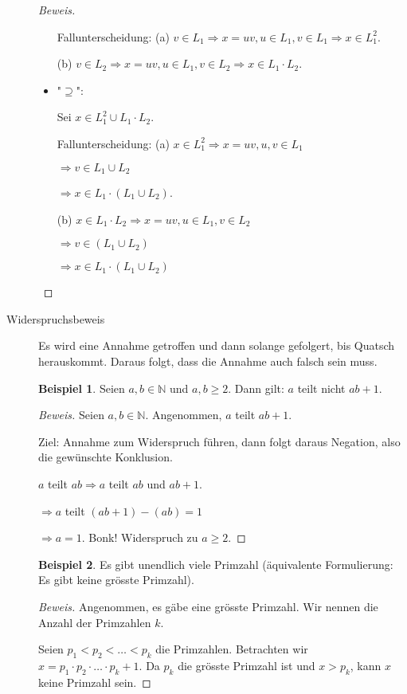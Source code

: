 \documentclass[11pt]{article} %
\theoremstyle{definition}
\newtheorem*{beispiel}{Beispiel}
\begin{document}
\begin{description}
\begin{proof}[Beweis]
\begin{itemize}
Fallunterscheidung: (a) $v \in L_1 \Rightarrow x = uv, u \in L_1, v \in L_1 \Rightarrow x \in L_1^2$.

(b) $v \in L_2 \Rightarrow x = uv, u \in L_1, v \in L_2 \Rightarrow x \in L_1\cdot L_2$.

\item "$\supseteq$":

Sei $x \in L_1^2 \cup L_1\cdot L_2$.

Fallunterscheidung: (a) $x \in L_1^2 \Rightarrow x = uv, u, v \in L_1 $

$\Rightarrow v \in L_1 \cup L_2$

$\Rightarrow x \in L_1\cdot(L_1 \cup L_2)$.

(b) $x \in L_1\cdot L_2 \Rightarrow x = uv, u \in L_1, v \in L_2$

$\Rightarrow v \in (L_1 \cup L_2)$

$\Rightarrow x \in L_1\cdot(L_1 \cup L_2)$
\end{itemize}
\end{proof}

\item[Widerspruchsbeweis] Es wird eine Annahme getroffen und dann solange gefolgert, bis Quatsch herauskommt. Daraus folgt, dass die Annahme auch falsch sein muss.

\begin{beispiel}
Seien $a,b \in \mathbb{N}$ und $a,b \ge 2$. Dann gilt: $a$ teilt nicht $ab + 1$.
\end{beispiel}
\begin{proof}[Beweis]
Seien $a,b \in \mathbb{N}$. Angenommen, $a$ teilt $ab + 1$.

Ziel: Annahme zum Widerspruch führen, dann folgt daraus Negation, also die gewünschte Konklusion.

$a$ teilt $ab \Rightarrow a$ teilt $ab$ und $ab + 1$.

$\Rightarrow a$ teilt $(ab + 1)-(ab) = 1$

$\Rightarrow a = 1$. Bonk! Widerspruch zu $a \ge 2$.
\end{proof}

\begin{beispiel}
Es gibt unendlich viele Primzahl (äquivalente Formulierung: Es gibt keine grösste Primzahl).
\end{beispiel}

\begin{proof}[Beweis]
Angenommen, es gäbe eine grösste Primzahl. Wir nennen die Anzahl der Primzahlen $k$.

Seien $p_1 < p_2 < \dots < p_k$ die Primzahlen. Betrachten wir $x = p_1\cdot p_2 \cdot \dots \cdot p_k + 1$. Da $p_k$ die grösste Primzahl ist und $x > p_k$, kann $x$ keine Primzahl sein.


\end{proof}
\end{description}
\end{document}
